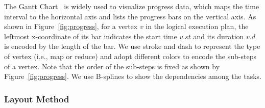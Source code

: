 The Gantt Chart~\cite{clark1922gantt} is widely used to visualize progress data, which maps the time interval to the horizontal axis and lists the progress bars on the vertical axis.
As shown in Figure~\ref{fig:progress}, for a vertex $v$ in the logical execution plan, the leftmost x-coordinate of its bar indicates the start time $v.st$ and its duration $v.d$ is encoded by the length of the bar. We use stroke and dash to represent the type of vertex (i.e., map or reduce) and adopt different colors to encode the sub-steps of a vertex. Note that the order of the sub-steps is fixed as shown by Figure~\ref{fig:progress}. We use B-splines to show the dependencies among the tasks.

\subsubsection{Layout Method}
%
%
